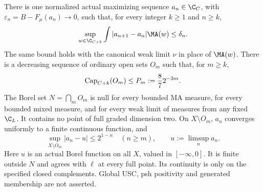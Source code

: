 \begin{theorem}\label{new:diagonal}
There is one normalized actual maximizing sequence $a_n\in\C_C$,
with $\varepsilon_n=B-F_\mu(a_n)\to0$, such that, for every integer
$k\ge1$ and $n\ge k$,
\begin{equation}\label{new:increment}
 \sup_{w\in\C_{C+k}}\int|a_{n+1}-a_n|\MA(w)\le\delta_n.
\end{equation}
The same bound holds with the canonical weak limit $\nu$ in place of
$\MA(w)$. There is a decreasing sequence of ordinary open sets $O_m$
such that, for $m\ge k$,
\begin{equation}\label{new:capacity}
 \operatorname{Cap}_{C+k}(O_m)\le P_m:={8\over7}2^{-3m}.
\end{equation}
The Borel set $N=\bigcap_mO_m$ is null for every bounded MA measure,
for every bounded mixed measure, and for every weak limit of measures
from any fixed $\C_L$. It contains no point of full graded dimension
two. On $X\setminus O_m$, $a_n$ converges uniformly to a finite
continuous function, and
\[
 \sup_{X\setminus O_m}|a_n-u|\le 2^{1-n}\quad(n\ge m),
 \qquad u:=\limsup_n a_n.
\]
Here $u$ is an actual Borel function on all $X$, valued in $[-\infty,0]$.
It is finite outside $N$ and agrees with $\ell$ at every full point.
Its continuity is only on the specified closed complements. Global
USC, psh positivity and generated membership are not asserted.
\end{theorem}
